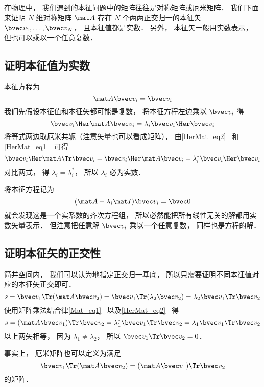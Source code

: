 
\begin{issues}
\issueTODO
\end{issues}


在物理中， 我们遇到的本征问题中的矩阵往往是对称矩阵或厄米矩阵． %
我们下面来证明 $N$ 维对称矩阵 $\mat A$ 存在 $N$ 个两两正交归一的本征矢 $\bvec v_1, \dots, \bvec v_N$， 且本征值都是实数． 另外， 本征矢一般用实数表示， 但也可以乘以一个任意复数．


\subsection{证明本征值为实数}
本征方程为
\begin{equation}
\mat A \bvec v_i = \bvec v_i
\end{equation}
我们先假设本征值和本征矢都可能是复数， 将本征方程左边乘以 $\bvec v_i$ 得
\begin{equation}
\bvec v_i\Her \mat A \bvec v_i = \lambda_i \bvec v_i\Her \bvec v_i
\end{equation}
将等式两边取厄米共轭（注意矢量也可以看成矩阵）， 由\autoref{HerMat_eq2}~ 和\autoref{HerMat_eq1}~ 可得
\begin{equation}
\bvec v_i\Her \mat A\Tr \bvec v_i = \bvec v_i\Her \mat A \bvec v_i = \lambda_i^* \bvec v_i\Her \bvec v_i
\end{equation}
对比两式， 得 $\lambda_i = \lambda_i^*$， 所以 $\lambda_i$ 必为实数．

将本征方程记为
\begin{equation}
(\mat A - \lambda_i\mat I)\bvec v_i = \bvec 0
\end{equation}
就会发现这是一个实系数的齐次方程组， 所以必然能把所有线性无关的解都用实数矢量表示． 但注意把任意解 $\bvec v_i$ 乘以一个任意复数， 同样也是方程的解．

\subsection{证明本征矢的正交性}
简并空间内， 我们可以认为地指定正交归一基底， 所以只需要证明不同本征值对应的本征矢正交即可．
\begin{equation}
s = \bvec v_1\Tr (\mat A \bvec v_2) = \bvec v_1\Tr (\lambda_2 \bvec v_2) = \lambda_2 \bvec v_1\Tr \bvec v_2
\end{equation}
使用矩阵乘法结合律\autoref{Mat_eq1}~ 以及\autoref{HerMat_eq2}~ 得
\begin{equation}
s = (\mat A \bvec v_1)\Tr \bvec v_2 = \lambda_1^* \bvec v_1\Tr \bvec v_2 = \lambda_1 \bvec v_1\Tr \bvec v_2
\end{equation}
以上两矢相等， 因为 $\lambda_1 \ne \lambda_2$， 所以 $\bvec v_1\Tr \bvec v_2 = 0$．

事实上， 厄米矩阵也可以定义为满足
\begin{equation}
\bvec v_1\Tr (\mat A \bvec v_2) = (\mat A \bvec v_1)\Tr \bvec v_2
\end{equation}
的矩阵．
